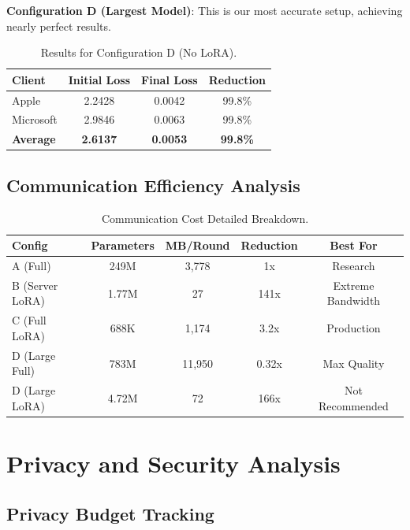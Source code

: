 \documentclass[acmsmall,screen]{acmart}
\begin{document}
\textbf{Configuration D (Largest Model)}: This is our most accurate setup, achieving nearly perfect results.
\begin{table}[h]
\centering
\caption{Results for Configuration D (No LoRA).}
\begin{tabular}{@{}lccc@{}}
\toprule
\textbf{Client} & \textbf{Initial Loss} & \textbf{Final Loss} & \textbf{Reduction} \\
\midrule
Apple & 2.2428 & 0.0042 & 99.8\% \\
Microsoft & 2.9846 & 0.0063 & 99.8\% \\
\midrule
\textbf{Average} & \textbf{2.6137} & \textbf{0.0053} & \textbf{99.8\%} \\
\bottomrule
\end{tabular}
\end{table}

\subsection{Communication Efficiency Analysis}

\begin{table}[h]
\centering
\caption{Communication Cost Detailed Breakdown.}
\label{tab:communication}
\begin{tabular}{@{}lcccc@{}}
\toprule
\textbf{Config} & \textbf{Parameters} & \textbf{MB/Round} & \textbf{Reduction} & \textbf{Best For} \\
\midrule
A (Full) & 249M & 3,778 & 1x & Research \\
B (Server LoRA) & 1.77M & 27 & 141x & Extreme Bandwidth \\
C (Full LoRA) & 688K & 1,174 & 3.2x & Production \\
D (Large Full) & 783M & 11,950 & 0.32x & Max Quality \\
D (Large LoRA) & 4.72M & 72 & 166x & Not Recommended \\
\bottomrule
\end{tabular}
\end{table}

\section{Privacy and Security Analysis}

\subsection{Privacy Budget Tracking}
\end{document}
